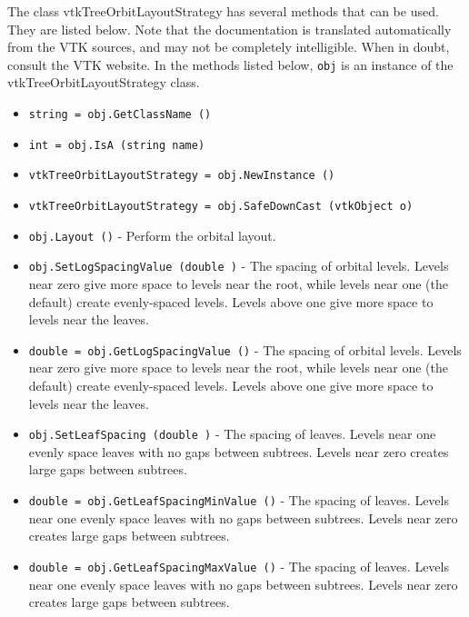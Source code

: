 The class vtkTreeOrbitLayoutStrategy has several methods that can be used.
  They are listed below.
Note that the documentation is translated automatically from the VTK sources,
and may not be completely intelligible.  When in doubt, consult the VTK website.
In the methods listed below, \verb|obj| is an instance of the vtkTreeOrbitLayoutStrategy class.
\begin{itemize}
\item  \verb|string = obj.GetClassName ()|

\item  \verb|int = obj.IsA (string name)|

\item  \verb|vtkTreeOrbitLayoutStrategy = obj.NewInstance ()|

\item  \verb|vtkTreeOrbitLayoutStrategy = obj.SafeDownCast (vtkObject o)|

\item  \verb|obj.Layout ()| -  Perform the orbital layout.

\item  \verb|obj.SetLogSpacingValue (double )| -  The spacing of orbital levels. Levels near zero give more space
 to levels near the root, while levels near one (the default)
 create evenly-spaced levels. Levels above one give more space
 to levels near the leaves.

\item  \verb|double = obj.GetLogSpacingValue ()| -  The spacing of orbital levels. Levels near zero give more space
 to levels near the root, while levels near one (the default)
 create evenly-spaced levels. Levels above one give more space
 to levels near the leaves.

\item  \verb|obj.SetLeafSpacing (double )| -  The spacing of leaves.  Levels near one evenly space leaves
 with no gaps between subtrees.  Levels near zero creates
 large gaps between subtrees.

\item  \verb|double = obj.GetLeafSpacingMinValue ()| -  The spacing of leaves.  Levels near one evenly space leaves
 with no gaps between subtrees.  Levels near zero creates
 large gaps between subtrees.

\item  \verb|double = obj.GetLeafSpacingMaxValue ()| -  The spacing of leaves.  Levels near one evenly space leaves
 with no gaps between subtrees.  Levels near zero creates
 large gaps between subtrees.


\end{itemize}
